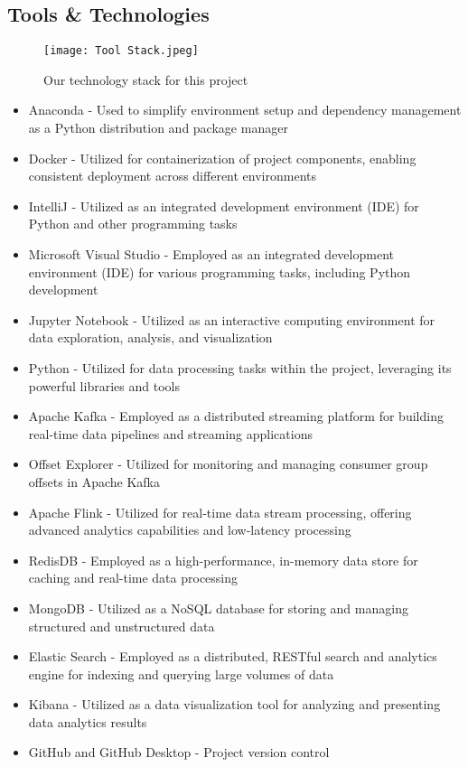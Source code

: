 \documentclass[conference]{IEEEtran}
\begin{document}
\subsection{Tools \& Technologies}
\begin{figure}[htbp]
\centerline{\texttt{[image: Tool Stack.jpeg]}}
\caption{Our technology stack for this project}
\label{fig}
\end{figure}
\begin{itemize}
\item Anaconda - Used to simplify environment setup and dependency management as a Python distribution and package manager
\item Docker -  Utilized for containerization of project components, enabling consistent deployment across different environments
\item IntelliJ - Utilized as an integrated development environment (IDE) for Python and other programming tasks
\item Microsoft Visual Studio - Employed as an integrated development environment (IDE) for various programming tasks, including Python development
\item Jupyter Notebook - Utilized as an interactive computing environment for data exploration, analysis, and visualization
\item Python - Utilized for data processing tasks within the project, leveraging its powerful libraries and tools
\item Apache Kafka - Employed as a distributed streaming platform for building real-time data pipelines and streaming applications
\item Offset Explorer - Utilized for monitoring and managing consumer group offsets in Apache Kafka
\item Apache Flink - Utilized for real-time data stream processing, offering advanced analytics capabilities and low-latency processing
\item RedisDB - Employed as a high-performance, in-memory data store for caching and real-time data processing
\item MongoDB - Utilized as a NoSQL database for storing and managing structured and unstructured data
\item Elastic Search - Employed as a distributed, RESTful search and analytics engine for indexing and querying large volumes of data
\item Kibana - Utilized as a data visualization tool for analyzing and presenting data analytics results
\item GitHub and GitHub Desktop - Project version control

\end{itemize}
\end{document}
